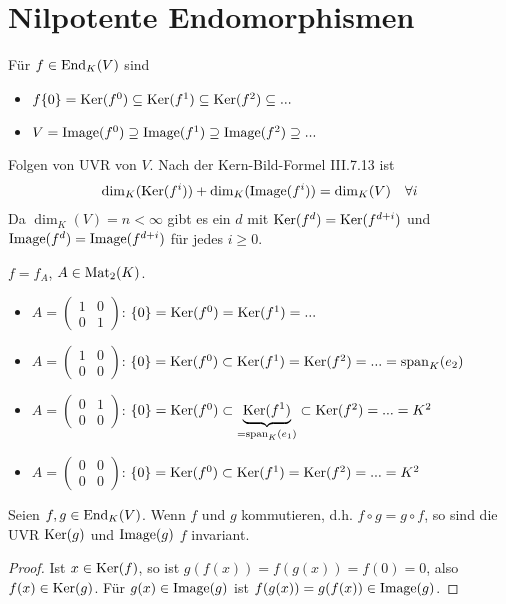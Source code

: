 \section{Nilpotente Endomorphismen}

\begin{remark}
	Für $f\in\operatorname{End}_K(V)$ sind 
	\begin{itemize}
		\item $f\{0\}=\operatorname{Ker}(f^0)\subseteq \operatorname{Ker}(f^1)\subseteq \operatorname{Ker}(f^2)\subseteq ...$
		\item $V=\operatorname{Image}(f^0)\supseteq \operatorname{Image}(f^1)\supseteq \operatorname{Image}(f^2)\supseteq ...$
	\end{itemize}
Folgen von UVR von $V$. Nach der Kern-Bild-Formel III.7.13 ist %
\begin{align}
	\dim_K(\operatorname{Ker}(f^i))+\dim_K(\operatorname{Image}(f^i))=\dim_K(V)\quad\forall i\notag
\end{align}
Da $\dim_K(V)=n<\infty$ gibt es ein $d$ mit $\operatorname{Ker}(f^d)=\operatorname{Ker}(f^{d+i})$ und $\operatorname{Image}(f^d)=\operatorname{Image}(f^{d+i})$ für jedes $i\ge 0$.
\end{remark}

\begin{example}
	$f=f_A$, $A\in\operatorname{Mat}_2(K)$.
	\begin{itemize}
		\item $A=\begin{pmatrix}1&0\\0&1\end{pmatrix}$: $\{0\}=\operatorname{Ker}(f^0)=\operatorname{Ker}(f^1)=...$
		\item $A=\begin{pmatrix}1&0\\0&0\end{pmatrix}$: $\{0\}=\operatorname{Ker}(f^0)\subset\operatorname{Ker}(f^1)=\operatorname{Ker}(f^2)=...=\operatorname{span}_K(e_2)$
		\item $A=\begin{pmatrix}0&1\\0&0\end{pmatrix}$: $\{0\}=\operatorname{Ker}(f^0)\subset\underbrace{\operatorname{Ker}(f^1)}_{=\operatorname{span}_K(e_1)}\subset \operatorname{Ker}(f^2)=... = K^2$
		\item $A=\begin{pmatrix}0&0\\0&0\end{pmatrix}$: $\{0\}=\operatorname{Ker}(f^0)\subset\operatorname{Ker}(f^1)=\operatorname{Ker}(f^2)=...=K^2$
	\end{itemize}
\end{example}

\begin{lemma}
	Seien $f,g\in\operatorname{End}_K(V)$. Wenn $f$ und  $g$ kommutieren, d.h. $f\circ g=g\circ f$, so sind die UVR $\operatorname{Ker}(g)$ und $\operatorname{Image}(g)$ $f$ invariant.
\end{lemma}
\begin{proof}
	Ist $x\in\operatorname{Ker}(f)$, so ist $g(f(x))=f(g(x))=f(0)=0$, also $f(x)\in\operatorname{Ker}(g)$. Für $g(x)\in\operatorname{Image}(g)$ ist $f(g(x))=g(f(x))\in\operatorname{Image}(g)$.
\end{proof}

